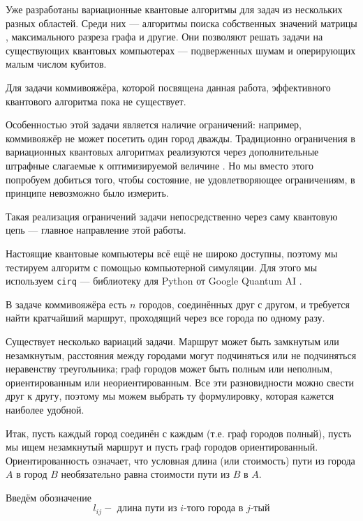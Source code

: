 Уже разработаны вариационные квантовые алгоритмы для задач из нескольких разных областей. Среди них --- алгоритмы поиска собственных значений матрицы \cite{VQE}, максимального разреза графа \cite{MaxCut} и другие. Они позволяют решать задачи на существующих квантовых компьютерах --- подверженных шумам и оперирующих малым числом кубитов.

Для задачи коммивояжёра, которой посвящена данная работа, эффективного квантового алгоритма пока не существует. 

Особенностью этой задачи является наличие ограничений: например, коммивояжёр не может посетить один город дважды. Традиционно ограничения в вариационных квантовых алгоритмах реализуются через дополнительные штрафные слагаемые к оптимизируемой величине \cite{QUBO-TSP, QUBO-TSP2, PenaltiesInVQE}. Но мы вместо этого попробуем добиться того, чтобы состояние, не удовлетворяющее ограничениям, в принципе невозможно было измерить.

Такая реализация ограничений задачи непосредственно через саму квантовую цепь --- главное направление этой работы.

Настоящие квантовые компьютеры всё ещё не широко доступны, поэтому мы тестируем алгоритм с помощью компьютерной симуляции. Для этого мы используем \texttt{cirq} --- библиотеку для Python от Google Quantum AI \cite{cirq}.



В задаче коммивояжёра есть $n$ городов, соединённых друг с другом, и требуется найти кратчайший маршрут, проходящий через все города по одному разу.

Существует несколько вариаций задачи. Маршрут может быть замкнутым или незамкнутым, расстояния между городами могут подчиняться или не подчиняться неравенству треугольника; граф городов может быть полным или неполным, ориентированным или неориентированным. Все эти разновидности можно свести друг к другу, поэтому мы можем выбрать ту формулировку, которая кажется наиболее удобной. 

Итак, пусть каждый город соединён с каждым (т.е. граф городов полный), пусть мы ищем незамкнутый маршрут и пусть граф городов ориентированный. Ориентированность означает, что условная длина (или стоимость) пути из города $A$ в город $B$ необязательно равна стоимости пути из $B$ в $A$.

Введём обозначение
\[
l_{ij} - \text{ длина пути из $i$-того города в $j$-тый}
\]

